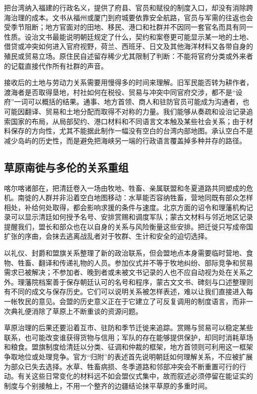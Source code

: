 把台湾纳入福建的行政名义，提供了府县、官员和赋役的制度入口，却没有消除跨海治理的成本。文书从福州或厦门到府城要依靠安全航路，官员与军需的往返也会受季节阻断；地方官面对的田地、移民、港口和社群并不因同一套官名而具有同一性质。设治文书最能说明朝廷规定了什么，契约和案卷更可能显示某一地的土地、借贷或冲突如何进入官府视野，荷兰、西班牙、日文及其他海洋材料又各带自身的殖民或贸易立场。原住民自述留存稀少尤其限制了判断：不能将官府分类或外来者的记载直接代作所有社群的声音。

接收后的土地与劳动力关系需要用慢得多的时间来理解。旧军民能否转为耕作者，渡海者是否取得垦地，村社如何在税役、贸易与冲突中同官府交涉，都不是“设府”一词可以概括的结果。通事、地方首领、商人和驻防官员可能成为沟通者，也可能因翻译、贸易和土地分配而取得不对称的力量。我们能够从奏疏和设治记录追索国家的布局，从局部契约、港口材料和不同语言文本触及某些社会关系；由于材料保存的方向性，尤其不能据此制作一幅没有空白的台湾内部地图。承认空白不是减少岛屿的历史性，而是避免把海峡另一端的行政语言覆盖掉多种并存的路径。

\subsection*{草原南徙与多伦的关系重组}

喀尔喀诸部在，把清廷卷入一场由牧地、牲畜、亲属联盟和冬夏道路共同塑成的危机。南徙的人群并非沿着空白地图移动：水草能否容纳牲畜，营地同既有部众怎样相处，补给何处取得，都会影响求援的条件与速度。北京方面的诏令和理藩机构记录可以显示清廷如何授予名号、安排赏赐和调度军队；蒙古文材料与邻近地区记录提醒我们，盟长和部众也在以自身的关系与风险衡量这些安排。把迁徙只写成帝国扩张的序曲，会抹去逃离战乱者对于牧群、生计和安全的迫切选择。

以礼仪、封爵和盟旗关系整理了新的政治联系，但会盟地点本身需要临时营地、食物、牲畜、翻译和传递礼物的人员。参加仪式并不等于牧地纠纷、部际竞争和贸易需求已被解决；不参加者、晚到者或未被文书记录的人也不应自动视为处在关系之外。理藩院档案善于保存朝廷认可的名号和程序，蒙古文文书、碑刻与口述整理则有不同的成文与保存历史。它们可以说明关系被怎样表述，难以让我们直接进入每一帐牧民的意见。会盟的历史意义正在于它建立了可反复调用的制度语言，而非一次典礼便消除了草原上不断重谈的资源问题。

草原治理的后果还要沿着互市、驻防和季节迁徙来追踪。赏赐与贸易可以稳定某些联系，也可能改变谁获得货物与信用；军队的存在能够提供保护，却同时消耗草场和粮食。盟旗制度给清廷以分类、征调和仲裁的框架，地方首领则可利用这一框架争取地位或处理竞争。官方“归附”的表述首先说明朝廷如何理解关系，不应被扩展为部众已失去选择。水草、牲畜病损、冬季道路和邻部冲突会不断重置可行的行动。有关这些日常变化的材料远不如会盟仪式集中，故而叙述必须停留在能证实的制度与个别接触上，不用一个整齐的边疆结论抹平草原的多重时间。

